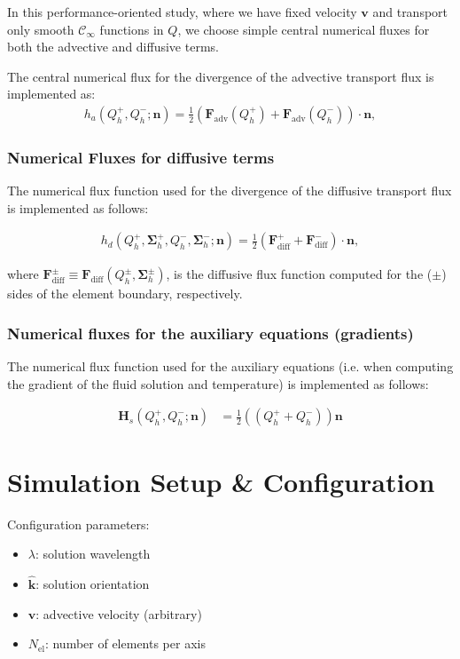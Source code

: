 \documentclass[11pt]{article}
\renewcommand{\vec}[1]{\bm{#1}}
\begin{document}
In this performance-oriented study, where we have fixed velocity $\vec{v}$ and transport only smooth
$\mathcal{C}_\infty$ functions in $Q$, we choose simple central numerical fluxes for both the advective
and diffusive terms.

The central numerical flux for the divergence of the advective transport flux is implemented as:
\begin{align}
  h_{a}(Q_h^+, Q^-_h; \mathbf{n}) = \frac{1}{2}
  \left(\mathbf{F}_\text{adv}(Q_h^+)+\mathbf{F}_\text{adv}(Q_h^-)\right) \cdot \mathbf{n},
\end{align}


\subsubsection{Numerical Fluxes for diffusive terms}

The numerical flux function used for the divergence of the diffusive transport flux is implemented
as follows:

\begin{align}
   h_d(Q_h^+, \mathbf{\Sigma}_h^+, Q_h^-, \mathbf{\Sigma}_h^-;
   \mathbf{n}) = \frac{1}{2}\left(\mathbf{F}_\text{diff}^+ + \mathbf{F}_\text{diff}^-\right) \cdot \mathbf{n},
\end{align}

where $\mathbf{F}_\text{diff}^{\pm} \equiv \mathbf{F}_\text{diff}(Q_h^{\pm}, \mathbf{\Sigma}_h^{\pm})$, is the diffusive
flux function computed for the ($\pm$) sides of the element boundary, respectively.


\subsubsection{Numerical fluxes for the auxiliary equations (gradients)}

The numerical flux function used for the auxiliary equations (i.e. when computing the gradient
of the fluid solution and temperature) is implemented as follows:

\begin{align}
   \mathbf{H}_s(Q_h^+, Q_h^- ; \mathbf{n}) &= \frac{1}{2}\left(
   (Q_h^+ + Q_h^-)\right)\mathbf{n}
\end{align}

\section{Simulation Setup \& Configuration}

Configuration parameters:
\begin{itemize}
\item $\lambda$: solution wavelength
\item $\hat{\vec{k}}$: solution orientation
\item $\vec{v}$: advective velocity (arbitrary)
\item $N_{\text{el}}$: number of elements per axis
\end{itemize}
\end{document}
